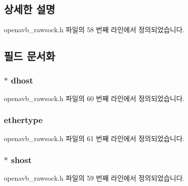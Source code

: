 \subsection{상세한 설명}


openavb\+\_\+rawsock.\+h 파일의 58 번째 라인에서 정의되었습니다.



\subsection{필드 문서화}
\subsubsection[{\texorpdfstring{dhost}{dhost}}]{$\ast$ dhost}\hypertarget{structhdr__info__t_a5a0b8fa2025e75a8db03f7a23cadc04e}{}\label{structhdr__info__t_a5a0b8fa2025e75a8db03f7a23cadc04e}


openavb\+\_\+rawsock.\+h 파일의 60 번째 라인에서 정의되었습니다.

\subsubsection[{\texorpdfstring{ethertype}{ethertype}}]{ ethertype}\hypertarget{structhdr__info__t_a54283e441ba9b75fc494232121266e2c}{}\label{structhdr__info__t_a54283e441ba9b75fc494232121266e2c}


openavb\+\_\+rawsock.\+h 파일의 61 번째 라인에서 정의되었습니다.

\subsubsection[{\texorpdfstring{shost}{shost}}]{$\ast$ shost}\hypertarget{structhdr__info__t_a603b5aebe0d4619ae32b09cd6612535f}{}\label{structhdr__info__t_a603b5aebe0d4619ae32b09cd6612535f}


openavb\+\_\+rawsock.\+h 파일의 59 번째 라인에서 정의되었습니다.

